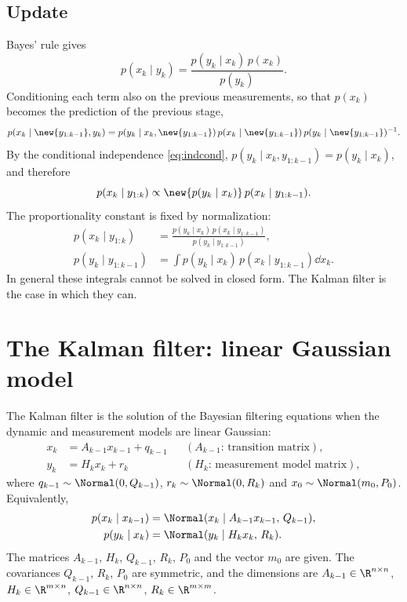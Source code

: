 \subsection{Update}
Bayes' rule gives
\begin{equation}
  p(x_k \mid y_k) = \frac{p(y_k \mid x_k)\, p(x_k)}{p(y_k)}.
\end{equation}
Conditioning each term also on the previous measurements, so that $p(x_k)$ becomes the prediction of the previous stage,
\begin{equation}
  p(x_k \mid \new{y_{1:k-1}}, y_k) = p(y_k \mid x_k, \new{y_{1:k-1}})\, p(x_k \mid \new{y_{1:k-1}})\, p(y_k \mid \new{y_{1:k-1}})^{-1}.
\end{equation}
By the conditional independence \eqref{eq:indcond}, $p(y_k \mid x_k, y_{1:k-1}) = p(y_k \mid x_k)$, and therefore
\begin{equation}
  p(x_k \mid y_{1:k}) \propto \new{p(y_k \mid x_k)}\, p(x_k \mid y_{1:k-1}). \label{eq:prop}
\end{equation}
The proportionality constant is fixed by normalization:
\begin{align}
  p(x_k \mid y_{1:k}) &= \frac{p(y_k \mid x_k)\, p(x_k \mid y_{1:k-1})}{p(y_k \mid y_{1:k-1})}, \label{eq:bayes}\\
  p(y_k \mid y_{1:k-1}) &= \int p(y_k \mid x_k)\, p(x_k \mid y_{1:k-1}) \dd x_k. \label{eq:norm}
\end{align}
In general these integrals cannot be solved in closed form. The Kalman filter is the case in which they can.

\section{The Kalman filter: linear Gaussian model}
The Kalman filter is the solution of the Bayesian filtering equations when the dynamic and measurement models are linear Gaussian:
\begin{align}
  x_k &= A_{k-1} x_{k-1} + q_{k-1} && (A_{k-1}\text{: transition matrix}), \label{eq:lin1}\\
  y_k &= H_k x_k + r_k && (H_k\text{: measurement model matrix}), \label{eq:lin2}
\end{align}
where $q_{k-1} \sim \Normal(0, Q_{k-1})$, $r_k \sim \Normal(0, R_k)$ and $x_0 \sim \Normal(m_0, P_0)$. Equivalently,
\begin{align}
  p(x_k \mid x_{k-1}) &= \Normal(x_k \mid A_{k-1}x_{k-1},\, Q_{k-1}), \\
  p(y_k \mid x_k) &= \Normal(y_k \mid H_k x_k,\, R_k).
\end{align}
The matrices $A_{k-1}$, $H_k$, $Q_{k-1}$, $R_k$, $P_0$ and the vector $m_0$ are given. The covariances $Q_{k-1}$, $R_k$, $P_0$ are symmetric, and the dimensions are $A_{k-1} \in \R^{n\times n}$, $H_k \in \R^{m\times n}$, $Q_{k-1} \in \R^{n\times n}$, $R_k \in \R^{m\times m}$.

